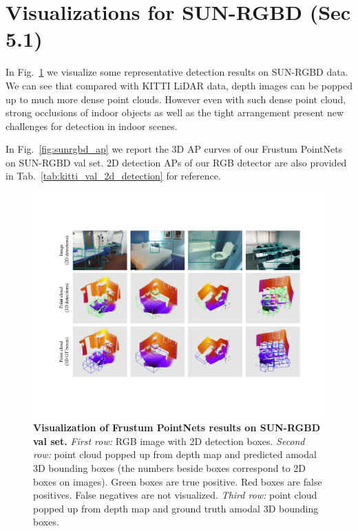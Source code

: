 \section{Visualizations for SUN-RGBD (Sec 5.1)}
\label{sec:supp_viz}

In Fig.~\ref{fig:sunrgbd_viz} we visualize some representative detection results on SUN-RGBD data. We can see that compared with KITTI LiDAR data, depth images can be popped up to much more dense point clouds. However even with such dense point cloud, strong occlusions of indoor objects as well as the tight arrangement present new challenges for detection in indoor scenes.

In Fig.~\ref{fig:sunrgbd_ap} we report the 3D AP curves of our Frustum PointNets on SUN-RGBD val set. 2D detection APs of our RGB detector are also provided in Tab.~\ref{tab:kitti_val_2d_detection} for reference. 


\begin{figure}[t!]
    \centering
    \includegraphics[width=0.95\linewidth]{./fig/sunrgbd_viz}
    \caption{\textbf{Visualization of Frustum PointNets results on SUN-RGBD val set.} \emph{First row:} RGB image with 2D detection boxes. \emph{Second row:} point cloud popped up from depth map and predicted amodal 3D bounding boxes (the numbers beside boxes correspond to 2D boxes on images). Green boxes are true positive. Red boxes are false positives. False negatives are not visualized. \emph{Third row:} point cloud popped up from depth map and ground truth amodal 3D bounding boxes.}
    \label{fig:sunrgbd_viz}
\end{figure}

